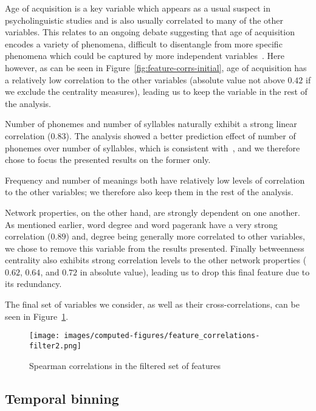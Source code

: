 
Age of acquisition is a key variable which appears as a usual suspect in psycholinguistic studies and is also usually correlated to many of the other variables.
This relates to an ongoing debate suggesting that age of acquisition encodes a variety of phenomena, difficult to disentangle from more specific phenomena which could be captured by more independent variables~\CN{}.
Here however, as can be seen in Figure~\ref{fig:feature-corrs-initial}, age of acquisition has a relatively low correlation to the other variables (absolute value not above $0.42$ if we exclude the centrality measures), leading us to keep the variable in the rest of the analysis.

Number of phonemes and number of syllables naturally exhibit a strong linear correlation ($0.83$).
The analysis showed a better prediction effect of number of phonemes over number of syllables, which is consistent with~\citet{nick-diss}, and we therefore chose to focus the presented results on the former only.

Frequency and number of meanings both have relatively low levels of correlation to the other variables; we therefore also keep them in the rest of the analysis.

\bigskip
Network properties, on the other hand, are strongly dependent on one another.
As mentioned earlier, word degree and word pagerank have a very strong correlation ($0.89$) and, degree being generally more correlated to other variables, we chose to remove this variable from the results presented.
Finally betweenness centrality also exhibits strong correlation levels to the other network properties ($0.62$, $0.64$, and $0.72$ in absolute value), leading us to drop this final feature due to its redundancy.

The final set of variables we consider, as well as their cross-correlations, can be seen in Figure~\ref{fig:feature-corrs-filtered}.

\begin{figure}[!th]
    \centering
    \texttt{[image: images/computed-figures/feature\_correlations-filter2.png]}
    \caption{Spearman correlations in the filtered set of features}
    \label{fig:feature-corrs-filtered}
\end{figure}


\subsection{Temporal binning}

